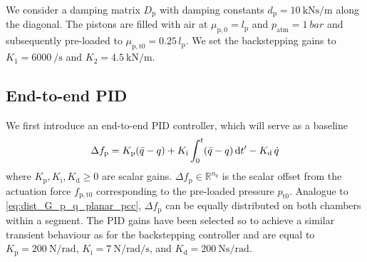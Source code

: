 We consider a damping matrix $D_\mathrm{p}$ with damping constants $d_\mathrm{p} = \SI{10}{\kilo \newton \second \per \meter}$ along the diagonal. The pistons are filled with air at $\mu_{\mathrm{p}, 0} = l_\mathrm{p}$ and $p_\mathrm{atm} = \SI{1}{bar}$ and subsequently pre-loaded to $\mu_{\mathrm{p}, \mathrm{t}0} = 0.25 \, l_\mathrm{p}$. %
We set the backstepping gains to $K_1 = \SI{6000}{\per \second}$ and $K_2 = \SI{4.5}{\kilo \newton \per \meter}$.

\subsection{End-to-end PID}
We first introduce an end-to-end PID controller, which will serve as a baseline
%
\begin{equation}\small
    \Delta f_\mathrm{p} = K_\mathrm{p} (\bar{q}-q) + K_\mathrm{i} \int_0^t (\bar{q}-q) \, \mathrm{d}t' - K_\mathrm{d} \, \dot{q}
\end{equation}
%
where $K_\mathrm{p},K_\mathrm{i},K_\mathrm{d} \geq 0$ are scalar gains. $\Delta f_\mathrm{p} \in \mathbb{R}^{n_q}$ is the scalar offset from the actuation force $f_{\mathrm{p},\mathrm{t}0}$ corresponding to the pre-loaded pressure $p_{\mathrm{t}0}$.
%
Analogue to \eqref{eq:dist_G_p_q_planar_pcc}, $\Delta f_\mathrm{p}$ can be equally distributed on both chambers within a segment.
The PID gains have been selected so to achieve a similar transient behaviour as for the backstepping controller %
and are equal to $K_\mathrm{p} = \SI{200}{\newton \per \radian}$, $K_\mathrm{i} = \SI{7}{\newton \per \radian \per \second}$, and $K_\mathrm{d} = \SI{200}{\newton \second \per \radian}$. 

